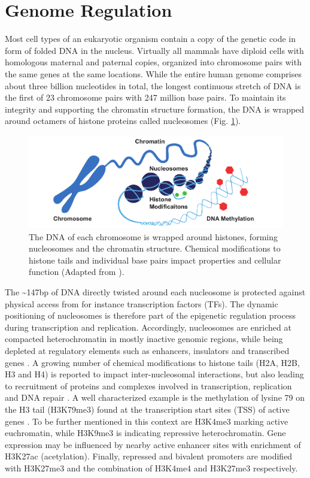 \section{Genome Regulation}
\label{sec:intro:bio}

Most cell types of an eukaryotic organism contain a copy of the genetic code in form of folded DNA in the nucleus.
Virtually all mammals have diploid cells with homologous maternal and paternal copies, organized into chromosome pairs with the same genes at the same locations.
While the entire human genome comprises about three billion nucleotides in total, the longest continuous stretch of DNA is the first of 23 chromosome pairs with 247 million base pairs. 
To maintain its integrity and supporting the chromatin structure formation, the DNA is wrapped around octamers of histone proteins called nucleosomes (Fig. \ref{fig:intro:chromatin}).


\begin{figure}[h]
	\centering
	\includegraphics[width=1.0\textwidth]{figures/intro/chromatin.pdf}
	\captionsetup{format=plain}
	\caption[Chromosome to nucleotide structure]{The DNA of each chromosome is wrapped around histones, forming nucleosomes and the chromatin structure. Chemical modifications to histone tails and individual base pairs impact properties and cellular function (Adapted from \cite{zymo2020}).}
	\label{fig:intro:chromatin}
\end{figure}

The \textasciitilde 147bp of DNA directly twisted around each nucleosome is protected against physical access from for instance transcription factors (TFs). 
The dynamic positioning of nucleosomes is therefore part of the epigenetic regulation process during transcription and replication.
Accordingly, nucleosomes are enriched at compacted heterochromatin in mostly inactive genomic regions, while being depleted at regulatory elements such as enhancers, insulators and transcribed genes \cite{Klemm2019}. 
A growing number of chemical modifications to histone tails (H2A, H2B, H3 and H4) is reported to impact inter-nucleosomal interactions, but also leading to recruitment of proteins and complexes involved in transcription, replication and DNA repair \cite{Bannister2011}. 
A well characterized example is the methylation of lysine 79 on the H3 tail (H3K79me3) found at the transcription start sites (TSS) of active genes \cite{Lawrence2016}. 
To be further mentioned in this context are H3K4me3 marking active euchromatin, while H3K9me3 is indicating repressive heterochromatin.
Gene expression may be influenced by nearby active enhancer sites with enrichment of H3K27ac (acetylation).
Finally, repressed and bivalent promoters are modified with H3K27me3 and the combination of H3K4me4 and H3K27me3 respectively.

